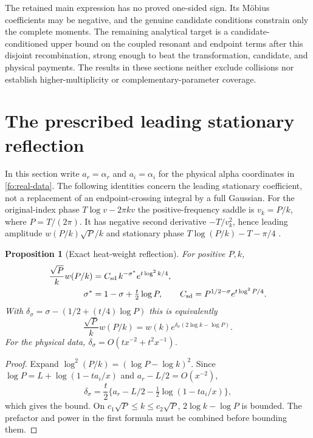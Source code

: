 \documentclass[11pt]{article}
\numberwithin{equation}{section}
\newtheorem{proposition}[theorem]{Proposition}
\theoremstyle{definition}
\theoremstyle{remark}
\begin{document}
The retained main expression has no proved one-sided sign.  Its
M\"obius coefficients may be negative, and the genuine candidate
conditions constrain only the complete moments.  The remaining
analytical target is a candidate-conditioned upper bound on the coupled
resonant and endpoint terms after this disjoint recombination, strong
enough to beat the transformation, candidate, and physical payments.
The results in these sections neither exclude collisions nor establish
higher-multiplicity or complementary-parameter coverage.

\section{The prescribed leading stationary reflection}
\label{sr:section}
In this section write $a_r=\alpha_r$ and $a_i=\alpha_i$ for the physical
alpha coordinates in \eqref{fo:real-data}.
The following identities concern the leading stationary coefficient,
not a replacement of an endpoint-crossing integral by a full Gaussian.
For the original-index phase $T\log v-2\pi kv$ the positive-frequency
saddle is $v_k=P/k$, where $P=T/(2\pi)$.
It has negative second derivative $-T/v_k^2$, hence leading amplitude
$w(P/k)\sqrt P/k$ and stationary phase
$T\log(P/k)-T-\pi/4$ \cite{dlmfstationary}.

\begin{proposition}[Exact heat-weight reflection]
\label{sr:weight}
For positive $P,k$,
\begin{align}
\frac{\sqrt P}{k}w(P/k)
 &= C_{\rm sd}\,k^{-\sigma^*}e^{t\log^2k/4},\notag\\
\sigma^*&=1-\sigma+\tfrac t2\log P,\qquad
C_{\rm sd}=P^{1/2-\sigma}e^{t\log^2P/4}.
\end{align}
With $\delta_\sigma=\sigma-(1/2+(t/4)\log P)$ this is equivalently
\begin{equation}
\frac{\sqrt P}{k}w(P/k)
 =w(k)e^{\delta_\sigma(2\log k-\log P)} .
\label{sr:amplitude}
\end{equation}
For the physical data,
$\delta_\sigma=O(tx^{-2}+t^2x^{-1})$.
\end{proposition}
\begin{proof}
Expand $\log^2(P/k)=(\log P-\log k)^2$.
Since $\log P=L+\log(1-ta_i/x)$ and $a_r-L/2=O(x^{-2})$,
\[
\delta_\sigma=\frac t2
\{a_r-L/2-\tfrac12\log(1-ta_i/x)\},
\]
which gives the bound. On $c_1\sqrt P\le k\le c_2\sqrt P$,
$2\log k-\log P$ is bounded. The prefactor and power in the
first formula must be combined before bounding them.
\end{proof}
\end{document}
